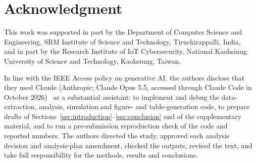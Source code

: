 \documentclass{ieeeaccess}
\theoremstyle{definition}
\theoremstyle{plain}
\begin{document}
\section*{Acknowledgment}
This work was supported in part by the Department of Computer Science and Engineering, SRM Institute of Science and Technology, Tiruchirappalli, India, and in part by the Research Institute of IoT Cybersecurity, National Kaohsiung University of Science and Technology, Kaohsiung, Taiwan.

In line with the IEEE Access policy on generative AI, the authors disclose that they used Claude (Anthropic; Claude Opus 5.5, accessed through Claude Code in October 2026)~\cite{claude2026} as a substantial assistant: to implement and debug the data-extraction, analysis, simulation and figure- and table-generation code, to prepare drafts of Sections~\ref{sec:introduction}--\ref{sec:conclusion} and of the supplementary material, and to run a pre-submission reproduction check of the code and reported numbers. The authors directed the study, approved each analysis decision and analysis-plan amendment, checked the outputs, revised the text, and take full responsibility for the methods, results and conclusions.
\end{document}
